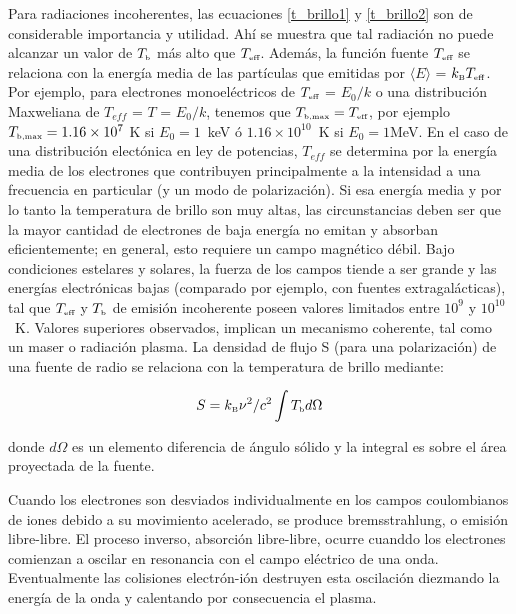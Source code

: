 Para radiaciones incoherentes, las ecuaciones \ref{t_brillo1} y \ref{t_brillo2} son de considerable importancia y utilidad. Ah\'i se muestra que tal radiaci\'on no puede alcanzar un valor de $T_{\mbox{\tiny b}}$ m\'as alto que $T_{\mbox{\tiny eff}}$. Adem\'as, la funci\'on fuente $T_{\mbox{\tiny eff}}$ se relaciona con la energ\'ia media de las part\'iculas que emitidas por $\langle E \rangle$ = $k_{\mbox{\tiny B}}T_{\mbox{\tiny eff}}$. Por ejemplo, para electrones monoel\'ectricos de $T_{\mbox{\tiny eff}}$ = $E_0/k$ o una distribuci\'on Maxweliana de $T_{eff}$ = $T$ = $E_0/k$, tenemos que $T_{\mbox{\tiny b,max}} = T_{\mbox{\tiny eff}}$, por ejemplo $T_{\mbox{\tiny b,max}} = 1.16 \times 10^7$ K si $E_0 = 1$~keV \'o $1.16 \times 10 ^{10}$~K si $E_0 = 1$MeV. En el caso de una distribuci\'on elect\'onica en ley de potencias, $T_{eff}$ se determina por la energ\'ia media de los electrones que contribuyen principalmente a la intensidad a una frecuencia en particular (y un modo de polarizaci\'on). Si esa energ\'ia media y por lo tanto la temperatura de brillo son muy altas, las circunstancias  deben ser que la mayor cantidad de electrones de baja energ\'ia no emitan y absorban eficientemente; en general, esto requiere un campo magn\'etico d\'ebil. Bajo condiciones estelares y solares, la fuerza de los campos tiende a ser grande y las energ\'ias electr\'onicas bajas (comparado por ejemplo, con fuentes extragal\'acticas), tal que $T_{\mbox{\tiny eff}}$ y $T_{\mbox{\tiny b}}$ de emisi\'on incoherente poseen valores limitados entre $10^9$ y $10^{10}$~K. Valores superiores observados, implican un mecanismo coherente, tal como un maser o radiaci\'on plasma.
La densidad de flujo S (para una polarizaci\'on) de una fuente de radio se relaciona con la temperatura de brillo mediante:

\begin{equation} \label{densidad_flujo}
S = k_{\mbox{\tiny B}}\nu^2/c^2 \int T_{\mbox{\tiny b}} d\Omega
\end{equation}

donde $d\Omega$ es un elemento diferencia de \'angulo s\'olido y la integral es sobre el \'area proyectada de la fuente.

Cuando los electrones son desviados individualmente en los campos coulombianos de iones debido a su movimiento acelerado, se produce bremsstrahlung, o emisi\'on libre-libre. El proceso inverso, absorci\'on libre-libre, ocurre cuanddo los electrones comienzan a oscilar en resonancia con el campo el\'ectrico de una onda. Eventualmente las colisiones electr\'on-i\'on destruyen esta oscilaci\'on diezmando la energ\'ia de la onda y calentando por consecuencia el plasma.

